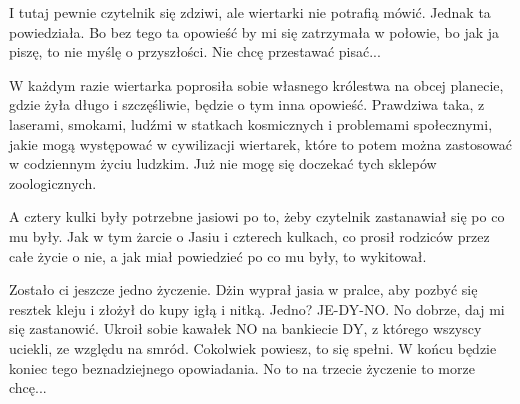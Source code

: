 I tutaj pewnie czytelnik się zdziwi, ale wiertarki nie potrafią mówić. Jednak ta powiedziała. Bo bez tego ta opowieść by mi się zatrzymała w połowie, bo jak ja piszę, to nie myślę o przyszłości. Nie chcę przestawać pisać...

W każdym razie wiertarka poprosiła sobie własnego królestwa na obcej planecie, gdzie żyła długo i szczęśliwie, będzie o tym inna opowieść.
Prawdziwa taka, z laserami, smokami, ludźmi w statkach kosmicznych i problemami społecznymi, jakie mogą występować w cywilizacji wiertarek, które to potem można zastosować w codziennym życiu ludzkim. Już nie mogę się doczekać tych sklepów zoologicznych.

A cztery kulki były potrzebne jasiowi po to, żeby czytelnik zastanawiał się po co mu były. 
Jak w tym żarcie o Jasiu i czterech kulkach, co prosił rodziców przez całe życie o nie, a jak miał powiedzieć po co mu były, to wykitował.

\begin{dialogue}
	\ds{} Zostało ci jeszcze jedno życzenie. \dm{} Dżin wyprał jasia w pralce, aby pozbyć się resztek kleju i złożył do kupy igłą i nitką.
	\ds{} Jedno?
	\ds{} JE-DY-NO.
	\ds{} No dobrze, daj mi się zastanowić. \dm{} Ukroił sobie kawałek NO na bankiecie DY, z którego wszyscy uciekli, ze względu na smród.
	\ds{} Cokolwiek powiesz, to się spełni. W końcu będzie koniec tego beznadziejnego opowiadania.
	\ds{} No to na trzecie życzenie to morze chcę...
\end{dialogue}









